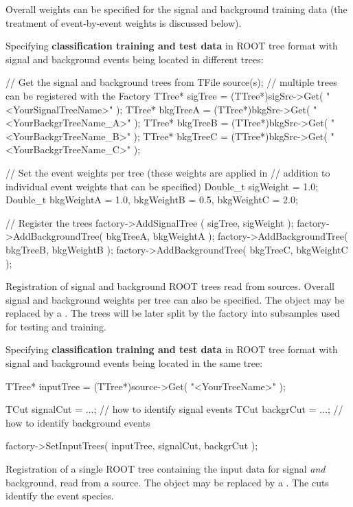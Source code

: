 Overall weights can be specified for the signal and background training data 
(the treatment of event-by-event weights is discussed below).

Specifying {\bf classification training and test data} in ROOT tree format with signal 
and background events being located in different trees:
\begin{codeexample}
\begin{tmvacode}
// Get the signal and background trees from TFile source(s); 
// multiple trees can be registered with the Factory
TTree* sigTree  = (TTree*)sigSrc->Get( "<YourSignalTreeName>"   );
TTree* bkgTreeA = (TTree*)bkgSrc->Get( "<YourBackgrTreeName_A>" );
TTree* bkgTreeB = (TTree*)bkgSrc->Get( "<YourBackgrTreeName_B>" );
TTree* bkgTreeC = (TTree*)bkgSrc->Get( "<YourBackgrTreeName_C>" );

// Set the event weights per tree (these weights are applied in 
// addition to individual event weights that can be specified)
Double_t sigWeight  = 1.0; 
Double_t bkgWeightA = 1.0, bkgWeightB = 0.5, bkgWeightC = 2.0;

// Register the trees
factory->AddSignalTree    ( sigTree,  sigWeight  );
factory->AddBackgroundTree( bkgTreeA, bkgWeightA );
factory->AddBackgroundTree( bkgTreeB, bkgWeightB );
factory->AddBackgroundTree( bkgTreeC, bkgWeightC );
\end{tmvacode}
\caption[.]{\codeexampleCaptionSize Registration of signal and background ROOT trees
            read from  sources. Overall signal and background weights
            per tree can also be specified.
            The  object may be replaced by a . The trees will be later split by the factory into subsamples used for testing and training.  }
\end{codeexample}

Specifying {\bf classification training and test data} in ROOT tree format with signal 
and background events being located in the same tree:
\begin{codeexample}
\begin{tmvacode}
TTree* inputTree = (TTree*)source->Get( "<YourTreeName>" );

TCut signalCut = ...;  // how to identify signal events 
TCut backgrCut = ...;  // how to identify background events

factory->SetInputTrees( inputTree, signalCut, backgrCut );
\end{tmvacode}
\caption[.]{\codeexampleCaptionSize Registration of a single ROOT tree containing the 
            input data for signal {\em and} background, read from a  source. 
            The  object may be replaced by a . The cuts
            identify the event species.}
\end{codeexample}

